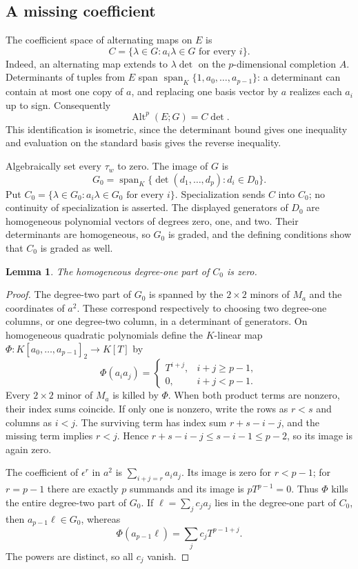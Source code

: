 \documentclass[11pt]{amsart}
\newtheorem{lemma}[theorem]{Lemma}
\theoremstyle{definition}
\theoremstyle{remark}
\numberwithin{equation}{section}
\newcommand{\Alt}{\operatorname{Alt}}
\newcommand{\spn}{\operatorname{span}}
\begin{document}
\subsection{A missing coefficient}

The coefficient space of alternating maps on $E$ is
\[
C=\{\lambda\in G:a_i\lambda\in G\text{ for every }i\}.
\]
Indeed, an alternating map extends to $\lambda\det$ on the $p$\nobreakdash-dimensional completion $A$.
Determinants of tuples from $E$ span $\spn_K\{1,a_0,\ldots,a_{p-1}\}$: a determinant can contain at
most one copy of $a$, and replacing one basis vector by $a$ realizes each $a_i$ up to sign. Consequently
\begin{equation}\label{dom:coefficient-space}
\Alt^p(E;G)=C\det.
\end{equation}
This identification is isometric, since the determinant bound gives one inequality and evaluation on the
standard basis gives the reverse inequality.

Algebraically set every $\tau_w$ to zero. The image of $G$ is
\[
G_0=\spn_K\{\det(d_1,\ldots,d_p):d_i\in D_0\}.
\]
Put $C_0=\{\lambda\in G_0:a_i\lambda\in G_0\text{ for every }i\}$. Specialization sends $C$ into $C_0$;
no continuity of specialization is asserted. The displayed generators of $D_0$ are homogeneous polynomial
vectors of degrees zero, one, and two. Their determinants are homogeneous, so $G_0$ is graded, and the
defining conditions show that $C_0$ is graded as well.

\begin{lemma}\label{dom:degree-gap}
The homogeneous degree-one part of $C_0$ is zero.
\end{lemma}

\begin{proof}
The degree-two part of $G_0$ is spanned by the $2\times2$ minors of $M_a$ and the coordinates of $a^2$.
These correspond respectively to choosing two degree-one columns, or one degree-two column, in a
determinant of generators. On homogeneous quadratic polynomials define the $K$\nobreakdash-linear map
$\Phi\colon K[a_0,\ldots,a_{p-1}]_2\to K[T]$ by
\[
\Phi(a_i a_j)=
\begin{cases}
T^{i+j},&i+j\ge p-1,\\
0,&i+j<p-1.
\end{cases}
\]
Every $2\times2$ minor of $M_a$ is killed by $\Phi$. When both product terms are nonzero, their index
sums coincide. If only one is nonzero, write the rows as $r<s$ and columns as $i<j$. The surviving term
has index sum $r+s-i-j$, and the missing term implies $r<j$. Hence
$r+s-i-j\le s-i-1\le p-2$, so its image is again zero.

The coefficient of $\epsilon^r$ in $a^2$ is $\sum_{i+j=r}a_i a_j$. Its image is zero for $r<p-1$;
for $r=p-1$ there are exactly $p$ summands and its image is $pT^{p-1}=0$. Thus $\Phi$ kills the entire
degree-two part of $G_0$. If $\ell=\sum_jc_j a_j$ lies in the degree-one part of $C_0$, then
$a_{p-1}\ell\in G_0$, whereas
\[
\Phi(a_{p-1}\ell)=\sum_jc_jT^{p-1+j}.
\]
The powers are distinct, so all $c_j$ vanish.
\end{proof}
\end{document}
